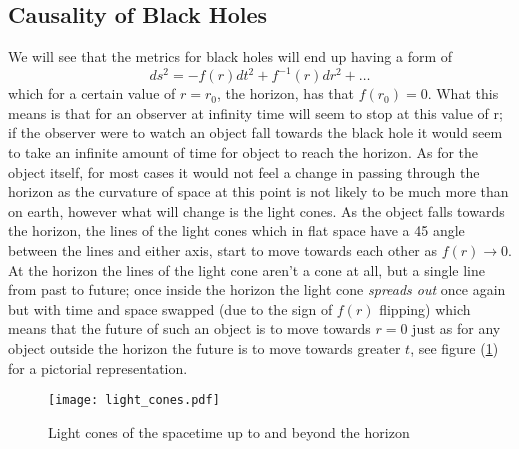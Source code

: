 \documentclass[12pt]{article}
\numberwithin{equation}{section}
\numberwithin{figure}{section}
\begin{document}
\subsection{Causality of Black Holes} %
\label{sub:understanding_black_holes}
We will see that the metrics for black holes will end up having a form of 
\begin{equation}
	ds^2= -f(r)dt^2 + f^{-1}(r)dr^2+\ldots
\end{equation}
which for a certain value of $r=r_{0}$, the horizon, has that $f(r_{0})=0$. What this means is that for an observer at infinity time will seem to stop at this value of r; if the observer were to watch an object fall towards the black hole it would seem to take an infinite amount of time for object to reach the horizon. As for the object itself, for most cases it would not feel a change in passing through the horizon as the curvature of space at this point is not likely to be much more than on earth, however what will change is the light cones. As the object falls towards the horizon, the lines of the light cones which in flat space have a 45\textsuperscript{} angle between the lines and either axis, start to move towards each other as $f(r)\to 0$. At the horizon the lines of the light cone aren't a cone at all, but a single line from past to future; once inside the horizon the light cone \emph{spreads out} once again but with time and space swapped (due to the sign of $f(r)$ flipping) which means that the future of such an object is to move towards $r=0$ just as for any object outside the horizon the future is to move towards greater $t$, see figure (\ref{fig:light_cones}) for a pictorial representation.
\begin{figure}
        \texttt{[image: light\_cones.pdf]}
	\caption{Light cones of the spacetime up to and beyond the horizon }
	\label{fig:light_cones}
\end{figure}
%
%
\end{document}
